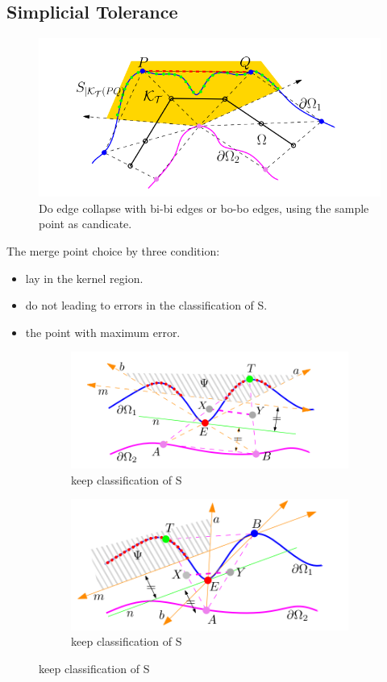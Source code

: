 \documentclass{article}
\theoremstyle{definition}
\theoremstyle{remark}
\begin{document}
  \subsection{Simplicial Tolerance}
  \begin{figure}[h]
    \includegraphics[width=\textwidth]{simplicial_tolerance.png}
    \caption{Do edge collapse with bi-bi edges or bo-bo edges, using the sample point as candicate.}
  \end{figure}
  The merge point choice by three condition:
  \begin{itemize}
    \item lay in the kernel region.
    \item do not leading to errors in the classification of S.
    \item the point with maximum error.
  \end{itemize}

  \begin{figure}[h]
      \begin{subfigure}[b]{0.5\textwidth}
        \includegraphics[width=\textwidth]{keep_classification0}
        \caption[a]{keep classification of S}
      \end{subfigure}
      \begin{subfigure}[b]{0.5\textwidth}
        \includegraphics[width=\textwidth]{keep_classification1}
        \caption[b]{keep classification of S}
      \end{subfigure}
  \end{figure}
\end{document}
